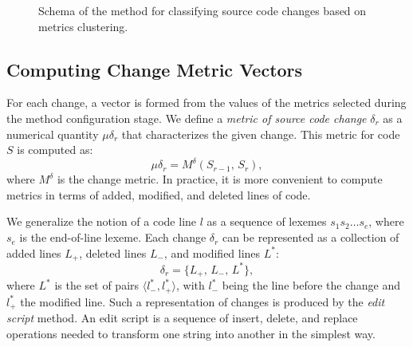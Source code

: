\documentclass[11pt,a4paper]{article}
\begin{document}
\begin{figure}[ht]
\centering
{}
\caption{Schema of the method for classifying source code changes based on metrics clustering.}
\label{fig:method}
\end{figure}

\subsection{Computing Change Metric Vectors}
\label{sec:metrics}

For each change, a vector is formed from the values of the metrics selected during the method configuration stage. We define a \textit{metric of source code change} $\delta_r$ as a numerical quantity $\mu\delta_r$ that characterizes the given change. This metric for code $S$ is computed as:
\begin{equation}
    \mu\delta_r = M^{\delta}(S_{r-1},\, S_r),
\end{equation}
where $M^{\delta}$ is the change metric. In practice, it is more convenient to compute metrics in terms of added, modified, and deleted lines of code.

We generalize the notion of a code line $l$ as a sequence of lexemes $s_1 s_2 \ldots s_e$, where $s_e$ is the end-of-line lexeme. Each change $\delta_r$ can be represented as a collection of added lines $L_+$, deleted lines $L_-$, and modified lines $L^*$:
\begin{equation}
    \delta_r = \{L_+,\, L_-,\, L^*\},
\end{equation}
where $L^*$ is the set of pairs $\langle l^*_-, l^*_+ \rangle$, with $l^*_-$ being the line before the change and $l^*_+$ the modified line. Such a representation of changes is produced by the \textit{edit script} method. An edit script is a sequence of insert, delete, and replace operations needed to transform one string into another in the simplest way.
\end{document}
